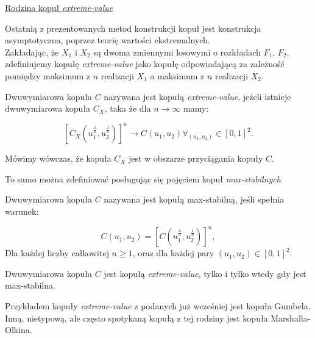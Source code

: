 \underline{Rodzina kopuł \emph{extreme-value}}
\vspace{0.5cm}

Ostatnią z prezentowanych metod konstrukcji kopuł jest konstrukcja asymptotyczna, poprzez teorię wartości ekstremalnych.\\
Zakładając, że $X_1$ i $X_2$ są dwoma zmiennymi losowymi o rozkładach $F_1$, $F_2$, zdefiniujemy kopułę \emph{extreme-value} jako kopułę odpowiadającą za zależność pomiędzy maksimum z $n$ realizacji $X_1$ a maksimum z $n$ realizacji $X_2$. 

\begin{df}
	Dwuwymiarowa kopuła $C$ nazywana jest kopułą \emph{extreme-value}, jeżeli istnieje dwuwymiarowa kopuła $C_X$, taka że dla $n\to\infty$ mamy:
	
	$$ [C_X(u_1^{\frac{1}{n}}, u_2^{\frac{1}{n}})]^n \to C(u_1, u_2) \forall_{(u_1, u_2)}\in [0,1]^2.$$
	
	Mówimy wówczas, że kopuła $C_X$ jest w obszarze przyciągania kopuły $C$.
\end{df}

To samo można zdefiniować posługując się pojęciem kopuł \emph{max-stabilnych}
\begin{df}
	Dwuwymiarowa kopuła $C$ nazywana jest kopułą max-stabilną, jeśli spełnia warunek:
	
	$$ C(u_1, u_2) = [C(u_1^{\frac{1}{n}}, u_2^{\frac{1}{n}})]^n,$$
	Dla każdej liczby całkowitej $n\geqslant 1$, oraz dla każdej pary ${(u_1, u_2)}\in [0,1]^2.$
	
\end{df}
\begin{thm}
	Dwuwymiarowa kopuła $C$ jest kopułą \emph{extreme-value}, tylko i tylko wtedy gdy jest max-stabilna.
\end{thm}

Przykładem kopuły \emph{extreme-value} z podanych już wcześniej jest kopuła Gumbela. Inną, nietypową, ale często spotykaną kopułą z tej rodziny jest kopuła Marshalla-Olkina.

